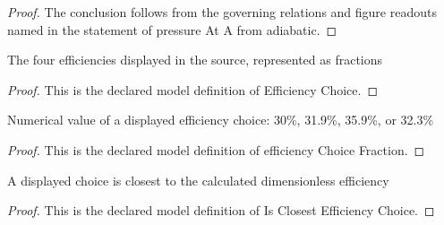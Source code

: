 \begin{proof}
  The conclusion follows from the governing relations and figure readouts named in the statement of pressure At A from adiabatic.
\end{proof}
\begin{definition}
  \label{def:physics:phyx-mini-0347:phyxminiproblems-problemphyxmini0347-efficiencychoice}
  The four efficiencies displayed in the source, represented as fractions
\end{definition}
\begin{proof}
  This is the declared model definition of Efficiency Choice.
\end{proof}
\begin{definition}
  \label{def:physics:phyx-mini-0347:phyxminiproblems-problemphyxmini0347-efficiencychoicefraction}
  Numerical value of a displayed efficiency choice: 30\%, 31.9\%, 35.9\%, or 32.3\%
\end{definition}
\begin{proof}
  This is the declared model definition of efficiency Choice Fraction.
\end{proof}
\begin{definition}
  \label{def:physics:phyx-mini-0347:phyxminiproblems-problemphyxmini0347-isclosestefficiencychoice}
  A displayed choice is closest to the calculated dimensionless efficiency
\end{definition}
\begin{proof}
  This is the declared model definition of Is Closest Efficiency Choice.
\end{proof}
